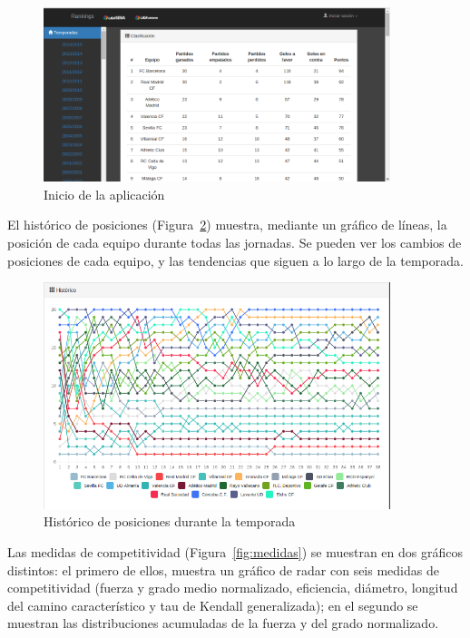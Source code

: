 \begin{figure}[htb]
\centering
\includegraphics[width=0.9\textwidth]{imagenes/pantallazos-aplicacion/inicio}
\caption{Inicio de la aplicación}
\label{fig:inicio-aplicacion}
\end{figure}

El histórico de posiciones (Figura~\ref{fig:inicio-historico}) muestra, mediante un gráfico de líneas, la posición de cada equipo durante todas las jornadas. Se pueden ver los cambios de posiciones de cada equipo, y las tendencias que siguen a lo largo de la temporada.\\


\begin{figure}[htb]
\centering
\includegraphics[width=0.9\textwidth]{imagenes/pantallazos-aplicacion/inicio-historico}
\caption{Histórico de posiciones durante la temporada}
\label{fig:inicio-historico}
\end{figure}

Las medidas de competitividad (Figura~\ref{fig:medidas}) se muestran en dos gráficos distintos: el primero de ellos, muestra un gráfico de radar con seis medidas de competitividad (fuerza  y grado medio normalizado, eficiencia, diámetro, longitud del camino característico y tau de Kendall generalizada); en el segundo se muestran las distribuciones acumuladas de la fuerza y del grado normalizado.\\

